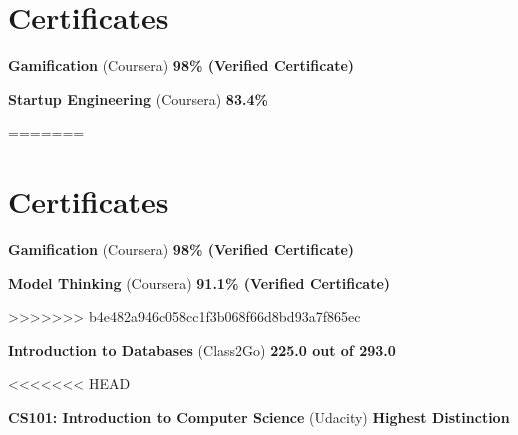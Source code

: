 \documentclass[margin,line]{resume}
\begin{document}
\begin{resume}
    \section{\mysidestyle Certificates}

    \begin{list2}
    \item \textbf{Gamification} (Coursera) \hspace{74mm} \textbf{98\% (Verified Certificate)}
    \end{list2}
	
	\begin{list2}
	\item \textbf{Startup Engineering} (Coursera) \hspace{94mm} \textbf{83.4\%}
	\end{list2}
=======
    \section{\mysidestyle Certificates}

    \begin{list2}
    \item \textbf{Gamification} (Coursera) \hspace{74mm} \textbf{98\% (Verified Certificate)}
    \end{list2}

    \begin{list2}
    \item \textbf{Model Thinking} (Coursera) \hspace{65mm} \textbf{91.1\% (Verified Certificate)}
    \end{list2}
>>>>>>> b4e482a946c058cc1f3b068f66d8bd93a7f865ec

	\begin{list2}
	\item \textbf{Introduction to Databases} (Class2Go) \hspace{64mm} \textbf{225.0 out of 293.0}
    \end{list2}

    \begin{list2}
<<<<<<< HEAD
	\item \textbf{CS101: Introduction to Computer Science} (Udacity) \hspace{34mm} \textbf{Highest Distinction}
	\end{list2}


\end{resume}
\end{document}
